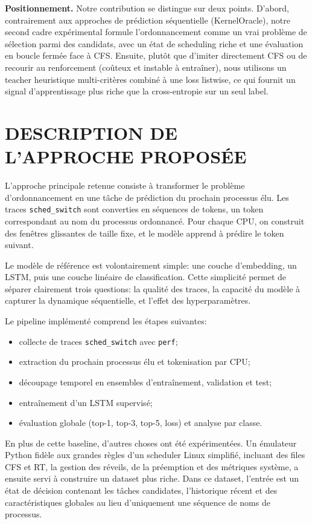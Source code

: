 \documentclass[letterpaper, 10 pt, conference]{ieeeconf}  %
\begin{document}
\textbf{Positionnement.}
Notre contribution se distingue sur deux points. D'abord, 
contrairement aux approches de prédiction séquentielle 
(KernelOracle), notre second cadre expérimental formule 
l'ordonnancement comme un vrai problème de sélection parmi 
des candidats, avec un état de scheduling riche et une 
évaluation en boucle fermée face à CFS. Ensuite, plutôt que 
d'imiter directement CFS ou de recourir au renforcement 
(coûteux et instable à entraîner), nous utilisons un teacher 
heuristique multi-critères combiné à une loss listwise, ce 
qui fournit un signal d'apprentissage plus riche que la 
cross-entropie sur un seul label.

\section{DESCRIPTION DE L'APPROCHE PROPOSÉE}

L'approche principale retenue consiste à transformer le problème d'ordonnancement en une tâche de prédiction du prochain processus élu. Les traces \texttt{sched\_switch} sont converties en séquences de tokens, un token correspondant au nom du processus ordonnancé. Pour chaque CPU, on construit des fenêtres glissantes de taille fixe, et le modèle apprend à prédire le token suivant.

Le modèle de référence est volontairement simple: une couche d'embedding, un LSTM, puis une couche linéaire de classification. Cette simplicité permet de séparer clairement trois questions: la qualité des traces, la capacité du modèle à capturer la dynamique séquentielle, et l'effet des hyperparamètres.

Le pipeline implémenté comprend les étapes suivantes:
\begin{itemize}
    \item collecte de traces \texttt{sched\_switch} avec \texttt{perf};
    \item extraction du prochain processus élu et tokenisation par CPU;
    \item découpage temporel en ensembles d'entraînement, validation et test;
    \item entraînement d'un LSTM supervisé;
    \item évaluation globale (top-1, top-3, top-5, loss) et analyse par classe.
\end{itemize}


En plus de cette baseline, d'autres choses ont été expérimentées. Un émulateur Python fidèle aux grandes règles d'un scheduler Linux simplifié, incluant des files CFS et RT, la gestion des réveils, de la préemption et des métriques système, a ensuite servi à construire un dataset plus riche. Dans ce dataset, l'entrée est un état de décision contenant les tâches candidates, l'historique récent et des caractéristiques globales au lieu d'uniquement une séquence de noms de processus.
\end{document}
